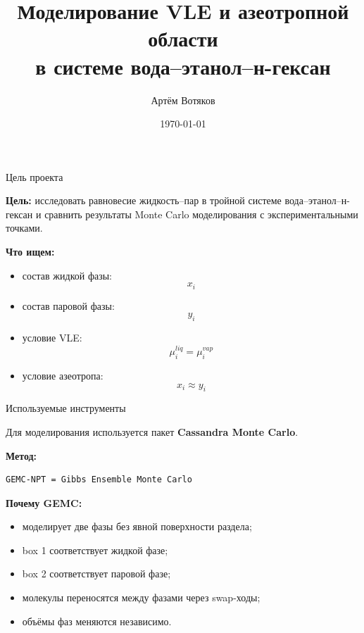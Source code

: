 \documentclass[10pt, aspectratio=169]{beamer}
\title[VLE в Cassandra]{Моделирование VLE и азеотропной области \\ в системе вода--этанол--н-гексан}
\author{Артём Вотяков}
\institute{Cassandra Monte Carlo}
\date{\today}
\begin{document}
\begin{frame}
    \titlepage
\end{frame}

\begin{frame}{Цель проекта}

\textbf{Цель:} исследовать равновесие жидкость--пар в тройной системе
вода--этанол--н-гексан и сравнить результаты Monte Carlo моделирования
с экспериментальными точками.

\vspace{0.4cm}

\textbf{Что ищем:}

\begin{itemize}
    \item состав жидкой фазы:
    \[
        x_i
    \]
    \item состав паровой фазы:
    \[
        y_i
    \]
    \item условие VLE:
    \[
        \mu_i^{liq} = \mu_i^{vap}
    \]
    \item условие азеотропа:
    \[
        x_i \approx y_i
    \]
\end{itemize}

\end{frame}

\begin{frame}[fragile]{Используемые инструменты}

Для моделирования используется пакет \textbf{Cassandra Monte Carlo}.

\vspace{0.3cm}

\textbf{Метод:}

\begin{lstlisting}
GEMC-NPT = Gibbs Ensemble Monte Carlo
\end{lstlisting}

\vspace{0.2cm}

\textbf{Почему GEMC:}

\begin{itemize}
    \item моделирует две фазы без явной поверхности раздела;
    \item box 1 соответствует жидкой фазе;
    \item box 2 соответствует паровой фазе;
    \item молекулы переносятся между фазами через swap-ходы;
    \item объёмы фаз меняются независимо.
\end{itemize}

\end{frame}
\end{document}
